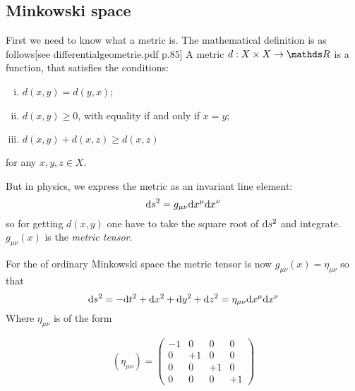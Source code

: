 \subsection{Minkowski space \checkmark}
	First we need to know what a metric is. 
	The mathematical definition is as follows[see differentialgeometrie.pdf p.85]
	A metric
	$ d:X\times X \rightarrow \R$ is a function, that satisfies the conditions:
		\begin{enumerate}[(i)]
			\item $d(x,y)=d(y,x)$;
			\item $d(x,y)\geq 0$, with equality if and only if $x=y$;
			\item $d(x,y)+d(x,z)\geq d(x,z)$
		\end{enumerate}
	for any $x,y,z \in X$.
	 
	But in physics, we express the metric as an invariant line element:
		\begin{equation}
		 	\mathrm{d} s^2 = g_{\mu\nu} \mathrm{d} x^\mu \mathrm{d} x^\nu
		\end{equation}
	so for getting $d(x,y)$ one have to take the square root of $\mathrm{d} s^2$ and integrate. $g_{\mu\nu}(x)$ is the \textit{metric tensor}.
	 
	 For the of ordinary Minkowski space the metric tensor is now $g_{\mu\nu}(x) = \eta_{\mu\nu}$ so that
		\begin{equation}
			\mathrm{d} s^2=- \mathrm{d} t^2 + \mathrm{d} x^2 + \mathrm{d} y^2 + \mathrm{d} z^2 = \eta_{\mu\nu} \mathrm{d} x^\mu \mathrm{d} x^\nu
		\end{equation}
	Where $\eta_{\mu\nu}$ is of the form

		\begin{equation}
		    \left(\eta_{\mu\nu}\right)=
		    \left(\begin{array}{cccc}
		    	-1 & 0 & 0 & 0\\
		    	0 & +1 & 0 & 0\\
		    	0 & 0 & +1 & 0\\
		    	0 & 0 & 0 & +1
			\end{array}\right)
		\end{equation}
	 

